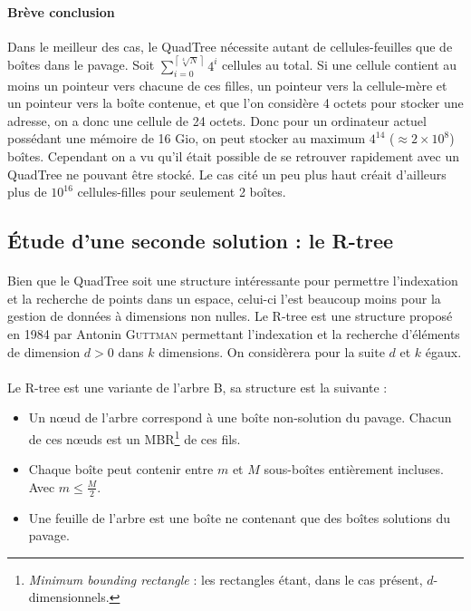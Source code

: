 \paragraph{Brève conclusion} Dans le meilleur des cas, le QuadTree nécessite autant de cellules-feuilles que de boîtes dans le pavage. Soit $\displaystyle {\sum_{i=0}^{\left\lceil{\sqrt[4]{N}}\right\rceil}} 4^i$ cellules au total. Si une cellule contient au moins un pointeur vers chacune de ces filles, un pointeur vers la cellule-mère et un pointeur vers la boîte contenue, et que l'on considère 4 octets pour stocker une adresse, on a donc une cellule de 24 octets.
Donc pour un ordinateur actuel possédant une mémoire de 16 Gio, on peut stocker au maximum $4^{14}$ ($\approx 2 \times 10^8$) boîtes. Cependant on a vu qu'il était possible de se retrouver rapidement avec un QuadTree ne pouvant être stocké. Le cas cité un peu plus haut créait d'ailleurs plus de $10^{16}$ cellules-filles pour seulement 2 boîtes.

\subsection{\'Etude d'une seconde solution : le R-tree}
\paragraph{}Bien que le QuadTree soit une structure intéressante pour permettre l'indexation et la recherche de points dans un espace, celui-ci l'est beaucoup moins pour la gestion de données à dimensions non nulles. Le R-tree est une structure proposé en 1984 par Antonin \textsc{Guttman} permettant l'indexation et la recherche d'éléments de dimension $d > 0$ dans $k$ dimensions\cite{Guttman}. On considèrera pour la suite $d$ et $k$ égaux.

\paragraph{}Le R-tree est une variante de l'arbre B, sa structure est la suivante :
\begin{itemize}
 \item Un nœud de l'arbre correspond à une boîte non-solution du pavage. Chacun de ces nœuds est un MBR\footnote{\og \emph{Minimum bounding rectangle}\fg{} : les rectangles étant, dans le cas présent, $d$-dimensionnels.} de ces fils.
 \item Chaque boîte peut contenir entre $m$ et $M$ sous-boîtes entièrement incluses. Avec $m\leq \frac{M}{2}$.
 \item Une feuille de l'arbre est une boîte ne contenant que des boîtes solutions du pavage.
\end{itemize}

